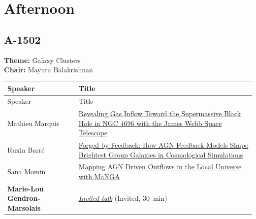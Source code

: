 \hypertarget{schedule-thursday-afternoon}{}
\section*{Afternoon}

\hypertarget{schedule-thursday-afternoon-a-1502}{}
\subsection*{A-1502}
\textbf{Theme:} Galaxy Clusters\\
\textbf{Chair:} Mayura Balakrishnan\\
{\small
{}
\sloppy
\setlength{\emergencystretch}{1em}
\begin{longtable}{@{}>{\TableRaggedRight\arraybackslash\hspace{0pt}}p{} >{\TableRaggedRight\arraybackslash\hspace{0pt}}p{}@{}}
\toprule
Speaker & Title \\
\midrule
\endfirsthead
\toprule
Speaker & Title \\
\midrule
\endhead
\hypertarget{schedule-talk-273}{}\label{schedule-page-talk-273}Mathieu Marquis & \hyperlink{abstract-talk-273}{Revealing Gas Inflow Toward the Supermassive Black Hole in NGC 4696 with the James Webb Space Telescope} \\
\hypertarget{schedule-talk-29}{}\label{schedule-page-talk-29}Ruxin Barré & \hyperlink{abstract-talk-29}{Forged by Feedback: How AGN Feedback Models Shape Brightest Group Galaxies in Cosmological Simulations} \\
\hypertarget{schedule-talk-144}{}\label{schedule-page-talk-144}Sana Momin & \hyperlink{abstract-talk-144}{Mapping AGN Driven Outflows in the Local Universe with MaNGA} \\
\hypertarget{invited-marie-lou-gendron-marsolais-sched}{}\label{invited-page-marie-lou-gendron-marsolais-sched}{\bfseries\color{cascagold}Marie-Lou Gendron-Marsolais} & \hyperlink{invited-marie-lou-gendron-marsolais}{\emph{Invited talk}} {\small\color{cascagold}(Invited, 30~min)} \\
\bottomrule
\end{longtable}
}

\hypertarget{schedule-thursday-afternoon-a-3561}{}
